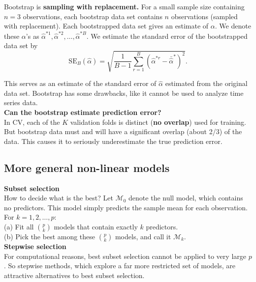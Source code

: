 \documentclass{article}
\begin{document}
Bootstrap is \textbf{sampling with replacement.} For a small sample size containing $n = 3$ observations, each bootstrap data set contains $n$ observations (sampled with replacement). Each bootstrapped data set gives an estimate of $\alpha$. We denote these $\alpha$'s as $\hat{\alpha}^{*1}, \hat{\alpha}^{*2}, \dots, \hat{\alpha}^{*B}.$ We estimate the standard error of the bootstrapped data set by $$
\mathrm{S E}_{B} ( \hat{\alpha} )=\sqrt{\frac{1} {B-1} \sum_{r=1}^{B} \left( \hat{\alpha}^{* r}-\bar{\hat{\alpha}}^{*} \right)^{2}}. 
$$

This serves as an estimate of the standard error of $\hat{\alpha}$ estimated from the original data set. Bootstrap has some drawbacks, like it cannot be used to analyze time series data.\\

\noindent \textbf{Can the bootstrap estimate prediction error?}
\\

In CV, each of the $K$ validation folds is distinct (\textbf{no overlap}) used for training. But bootstrap data must and will have a significant overlap (about 2/3) of the data. This causes it to seriously underestimate the true prediction error.

\subsection{More general non-linear models}

\textbf{Subset selection}\\

How to decide what is the best? Let $\mathcal{M}_0$ denote the null model, which contains no predictors. This model simply predicts the sample mean for each observation.\\

For $k = 1, 2, \dots, p:$\\
(a) Fit all $p \choose k$ models that contain exactly $k$ predictors.\\
(b) Pick the best among these $p \choose k$ models, and call it $\mathcal{M}_k$.\\

\noindent \textbf{Stepwise selection}\\

For computational reasons, best subset selection cannot be applied to very large $p$. So stepwise methods, which explore a far more restricted set of models, are attractive alternatives to best subset selection.\\
\end{document}
